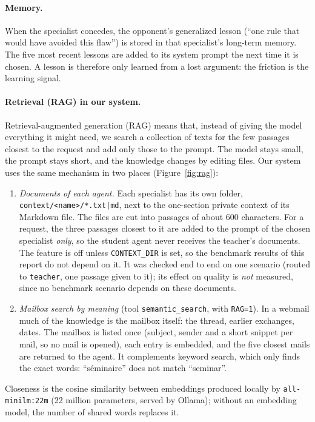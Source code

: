 \documentclass[11pt,a4paper]{article}
\newcommand{\code}[1]{\texttt{#1}}
\begin{document}
\paragraph{Memory.}
When the specialist concedes, the opponent's generalized lesson (``one rule that would have avoided this flaw'') is
stored in that specialist's long-term memory. The five most recent lessons are added to its system prompt the next
time it is chosen. A lesson is therefore only learned from a lost argument: the friction is the learning signal.

\paragraph{Retrieval (RAG) in our system.}
Retrieval-augmented generation (RAG) means that, instead of giving the model everything it might need, we search a
collection of texts for the few passages closest to the request and add only those to the prompt. The model stays small,
the prompt stays short, and the knowledge changes by editing files. Our system uses the same mechanism in two places
(Figure~\ref{fig:rag}):
\begin{enumerate}
  \item \emph{Documents of each agent.} Each specialist has its own folder, \code{context/<name>/*.txt|md}, next to the
        one-section private context of its Markdown file. The files are cut into passages of about 600 characters. For a
        request, the three passages closest to it are added to the prompt of the chosen specialist \emph{only}, so the
        student agent never receives the teacher's documents. The feature is off unless \code{CONTEXT\allowbreak\_DIR}
        is set, so the benchmark results of this report do not depend on it. It was checked end to end on one scenario
        (routed to \code{teacher}, one passage given to it); its effect on quality is \emph{not} measured, since no
        benchmark scenario depends on these documents.
  \item \emph{Mailbox search by meaning} (tool \code{semantic\_search}, with \code{RAG=1}). In a webmail much of the
        knowledge is the mailbox itself: the thread, earlier exchanges, dates. The mailbox is listed once (subject,
        sender and a short snippet per mail, so no mail is opened), each entry is embedded, and the five closest mails
        are returned to the agent. It complements keyword search, which only finds the exact words: ``séminaire'' does
        not match ``seminar''.
\end{enumerate}
Closeness is the cosine similarity between embeddings produced locally by \code{all-minilm:22m} (22 million
parameters, served by Ollama); without an embedding model, the number of shared words replaces it.
\end{document}

